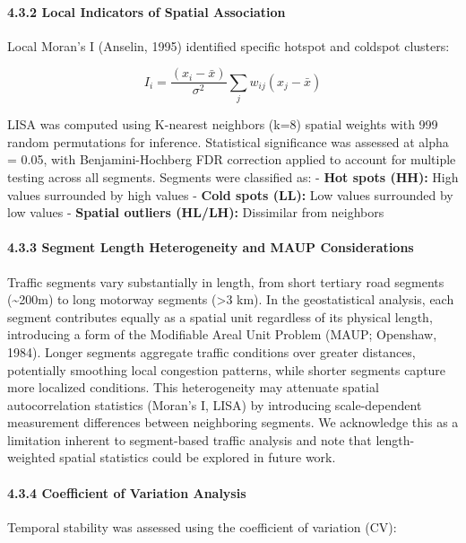 \paragraph{4.3.2 Local Indicators of Spatial Association}\label{local-indicators-of-spatial-association}

Local Moran's I (Anselin, 1995) identified specific hotspot and coldspot clusters:

\[I_i = \frac{(x_i - \bar{x})}{\sigma^2} \sum_j w_{ij}(x_j - \bar{x})\]

LISA was computed using K-nearest neighbors (k=8) spatial weights with 999 random permutations for inference. Statistical significance was assessed at alpha = 0.05, with Benjamini-Hochberg FDR correction applied to account for multiple testing across all segments. Segments were classified as: - \textbf{Hot spots (HH):} High values surrounded by high values - \textbf{Cold spots (LL):} Low values surrounded by low values - \textbf{Spatial outliers (HL/LH):} Dissimilar from neighbors

\paragraph{4.3.3 Segment Length Heterogeneity and MAUP Considerations}\label{segment-length-heterogeneity-and-maup-considerations}

Traffic segments vary substantially in length, from short tertiary road segments (\textasciitilde200m) to long motorway segments (\textgreater3 km). In the geostatistical analysis, each segment contributes equally as a spatial unit regardless of its physical length, introducing a form of the Modifiable Areal Unit Problem (MAUP; Openshaw, 1984). Longer segments aggregate traffic conditions over greater distances, potentially smoothing local congestion patterns, while shorter segments capture more localized conditions. This heterogeneity may attenuate spatial autocorrelation statistics (Moran's I, LISA) by introducing scale-dependent measurement differences between neighboring segments. We acknowledge this as a limitation inherent to segment-based traffic analysis and note that length-weighted spatial statistics could be explored in future work.

\paragraph{4.3.4 Coefficient of Variation Analysis}\label{coefficient-of-variation-analysis}

Temporal stability was assessed using the coefficient of variation (CV):

